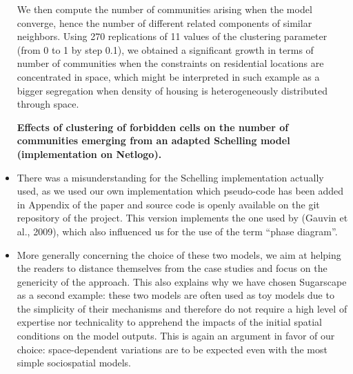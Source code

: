 \documentclass[11pt,a4paper,sans]{moderncv}        %
\begin{document}
\begin{itemize}
We then compute the number of communities arising when the model converge, hence the number of different related components of similar neighbors.
Using 270 replications of 11 values of the clustering parameter (from 0 to 1 by step 0.1), we obtained a significant growth in terms of number of communities when the constraints on residential locations are concentrated in space, which might be interpreted in such example as a bigger segregation when density of housing is heterogeneously distributed through space. 

\begin{minipage}{\textwidth}
\begin{center} 
 \textbf{Effects of clustering of forbidden cells on the number of communities emerging from an adapted Schelling model (implementation on Netlogo).} \label{fig:Fig1}
\end{center}
\end{minipage}
    
	\item There was a misunderstanding for the Schelling implementation actually used, as we used our own implementation which pseudo-code has been added in Appendix of the paper and source code is openly available on the git repository of the project. This version implements the one used by (Gauvin et al., 2009), which also influenced us for the use of the term ``phase diagram''.

    \item More generally concerning the choice of these two models, we aim at helping the readers to distance themselves from the case studies and focus on the genericity of the approach. This also explains why we have chosen Sugarscape as a second example: these two models are often used as toy models due to the simplicity of their mechanisms and therefore do not require a high level of expertise nor technicality to apprehend the impacts of the initial spatial conditions on the model outputs. This is again an argument in favor of our choice: space-dependent variations are to be expected even with the most simple sociospatial models.
	

\end{itemize}
\end{document}
